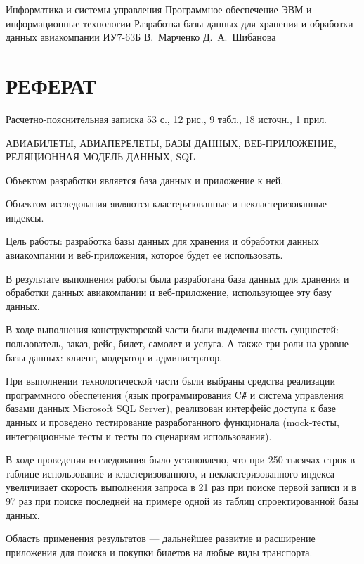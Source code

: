 \documentclass{bmstu}
\begin{document}
\makecourseworktitle
    {Информатика и системы управления}
    {Программное обеспечение ЭВМ и информационные технологии}
    {Разработка базы данных для хранения и обработки данных авиакомпании}
    {ИУ7-63Б}
    {В.~Марченко}
    {Д.~А.~Шибанова}
    {}
    {}
    
\setcounter{page}{3}

{\centering \chapter*{РЕФЕРАТ}}

Расчетно-пояснительная записка 53 с., 12 рис., 9 табл., 18 источн., 1 прил.

\noindent АВИАБИЛЕТЫ, АВИАПЕРЕЛЕТЫ, БАЗЫ ДАННЫХ, ВЕБ-ПРИЛОЖЕНИЕ, РЕЛЯЦИОННАЯ МОДЕЛЬ ДАННЫХ, SQL

Объектом разработки является база данных и приложение к ней.

Объектом исследования являются кластеризованные и некластеризованные индексы.

Цель работы: разработка базы данных для хранения и обработки данных авиакомпании и веб-приложения, которое будет ее использовать.

В результате выполнения работы была разработана база данных для хранения и обработки данных авиакомпании и веб-приложение, использующее эту базу данных.

В ходе выполнения конструкторской части были выделены шесть сущностей: пользователь, заказ, рейс, билет, самолет и услуга. 
А также три роли на уровне базы данных: клиент, модератор и администратор.

При выполнении технологической части были выбраны средства реализации программного обеспечения (язык программирования C\texttt{\#} и система управления базами данных Microsoft SQL Server), реализован интерфейс доступа к базе данных и проведено тестирование разработанного функционала (mock-тесты, интеграционные тесты и тесты по сценариям использования).

В ходе проведения исследования было установлено, что при 250 тысячах строк в таблице использование и кластеризованного, и некластеризованного индекса увеличивает скорость выполнения запроса в 21 раз при поиске первой записи и в 97 раз при поиске последней на примере одной из таблиц спроектированной базы данных.

Область применения результатов --- дальнейшее развитие и расширение приложения для поиска и покупки билетов на любые виды транспорта.
\end{document}
